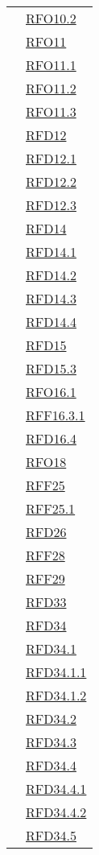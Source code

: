 \begin{longtable}{|>{\centering}m{5cm}|m{5cm}<{\centering}|}
& \hyperlink{RFO10.2}{RFO10.2}\\
& \hyperlink{RFO11}{RFO11}\\
& \hyperlink{RFO11.1}{RFO11.1}\\
& \hyperlink{RFO11.2}{RFO11.2}\\
& \hyperlink{RFO11.3}{RFO11.3}\\
& \hyperlink{RFD12}{RFD12}\\
& \hyperlink{RFD12.1}{RFD12.1}\\
& \hyperlink{RFD12.2}{RFD12.2}\\
& \hyperlink{RFD12.3}{RFD12.3}\\
& \hyperlink{RFD14}{RFD14}\\
& \hyperlink{RFD14.1}{RFD14.1}\\
& \hyperlink{RFD14.2}{RFD14.2}\\
& \hyperlink{RFD14.3}{RFD14.3}\\
& \hyperlink{RFD14.4}{RFD14.4}\\
& \hyperlink{RFD15}{RFD15}\\
& \hyperlink{RFD15.3}{RFD15.3}\\
& \hyperlink{RFO16.1}{RFO16.1}\\
& \hyperlink{RFF16.3.1}{RFF16.3.1}\\
& \hyperlink{RFD16.4}{RFD16.4}\\
& \hyperlink{RFO18}{RFO18}\\
& \hyperlink{RFF25}{RFF25}\\
& \hyperlink{RFF25.1}{RFF25.1}\\
& \hyperlink{RFD26}{RFD26}\\
& \hyperlink{RFF28}{RFF28}\\
& \hyperlink{RFF29}{RFF29}\\
& \hyperlink{RFD33}{RFD33}\\
& \hyperlink{RFD34}{RFD34}\\
& \hyperlink{RFD34.1}{RFD34.1}\\
& \hyperlink{RFD34.1.1}{RFD34.1.1}\\
& \hyperlink{RFD34.1.2}{RFD34.1.2}\\
& \hyperlink{RFD34.2}{RFD34.2}\\
& \hyperlink{RFD34.3}{RFD34.3}\\
& \hyperlink{RFD34.4}{RFD34.4}\\
& \hyperlink{RFD34.4.1}{RFD34.4.1}\\
& \hyperlink{RFD34.4.2}{RFD34.4.2}\\
& \hyperlink{RFD34.5}{RFD34.5}\\

\end{longtable}
